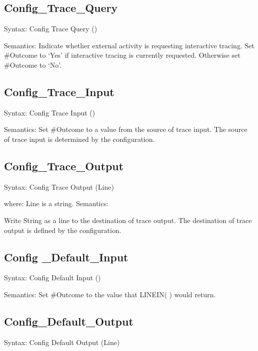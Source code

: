 \hypertarget{config_trace_query}{%
\subsection{Config\_Trace\_Query}\label{config_trace_query}}

Syntax: Config Trace Query ()

Semantics: Indicate whether external activity is requesting interactive
tracing. Set \#Outcome to `Yes' if interactive tracing is currently
requested. Otherwise set \#Outcome to `No'.

\hypertarget{config_trace_input}{%
\subsection{Config\_Trace\_Input}\label{config_trace_input}}

Syntax: Config Trace Input ()

Semantics: Set \#Outcome to a value from the source of trace input. The
source of trace input is determined by the configuration.

\hypertarget{config_trace_output}{%
\subsection{Config\_Trace\_Output}\label{config_trace_output}}

Syntax: Config Trace Output (Line)

where: Line is a string. Semantics:

Write String as a line to the destination of trace output. The
destination of trace output is defined by the configuration.

\hypertarget{config-_default_input}{%
\subsection{Config \_Default\_Input}\label{config-_default_input}}

Syntax: Config Default Input ()

Semantics: Set \#Outcome to the value that LINEIN( ) would return.

\hypertarget{config_default_output}{%
\subsection{Config\_Default\_Output}\label{config_default_output}}

Syntax: Config Default Output (Line)

